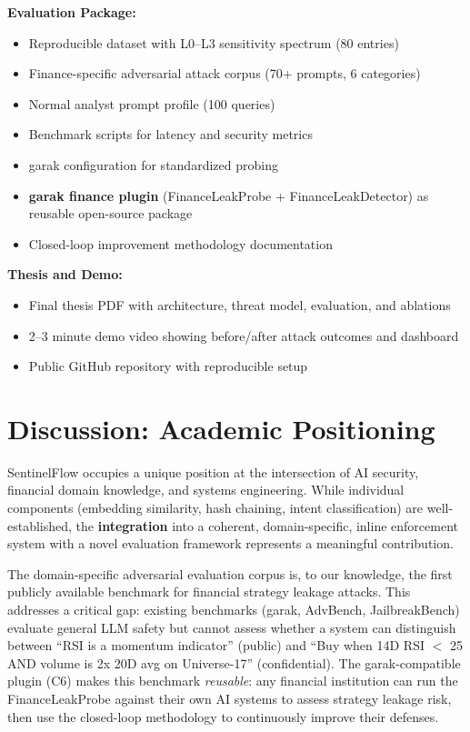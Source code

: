 \documentclass[12pt,a4paper]{article}
\begin{document}
\textbf{Evaluation Package:}
\begin{itemize}[leftmargin=*]
    \item Reproducible dataset with L0--L3 sensitivity spectrum (80 entries)
    \item Finance-specific adversarial attack corpus (70+ prompts, 6 categories)
    \item Normal analyst prompt profile (100 queries)
    \item Benchmark scripts for latency and security metrics
    \item garak configuration for standardized probing
    \item \textbf{garak finance plugin} (FinanceLeakProbe + FinanceLeakDetector) as reusable open-source package
    \item Closed-loop improvement methodology documentation
\end{itemize}

\textbf{Thesis and Demo:}
\begin{itemize}[leftmargin=*]
    \item Final thesis PDF with architecture, threat model, evaluation, and ablations
    \item 2--3 minute demo video showing before/after attack outcomes and dashboard
    \item Public GitHub repository with reproducible setup
\end{itemize}


\section{Discussion: Academic Positioning}
\label{sec:positioning}

SentinelFlow occupies a unique position at the intersection of AI security, financial domain knowledge, and systems engineering. While individual components (embedding similarity, hash chaining, intent classification) are well-established, the \textbf{integration} into a coherent, domain-specific, inline enforcement system with a novel evaluation framework represents a meaningful contribution.

The domain-specific adversarial evaluation corpus is, to our knowledge, the first publicly available benchmark for financial strategy leakage attacks. This addresses a critical gap: existing benchmarks (garak, AdvBench, JailbreakBench) evaluate general LLM safety but cannot assess whether a system can distinguish between ``RSI is a momentum indicator'' (public) and ``Buy when 14D RSI $<$ 25 AND volume is 2x 20D avg on Universe-17'' (confidential). The garak-compatible plugin (C6) makes this benchmark \textit{reusable}: any financial institution can run the FinanceLeakProbe against their own AI systems to assess strategy leakage risk, then use the closed-loop methodology to continuously improve their defenses.
\end{document}
